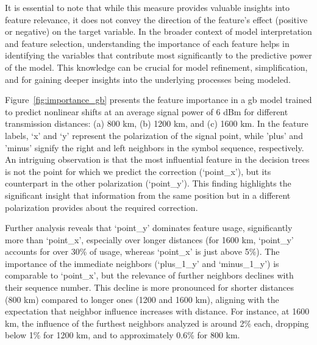 It is essential to note that while this measure provides valuable insights into feature relevance, it does not convey the direction of the feature's effect (positive or negative) on the target variable. In the broader context of model interpretation and feature selection, understanding the importance of each feature helps in identifying the variables that contribute most significantly to the predictive power of the model. This knowledge can be crucial for model refinement, simplification, and for gaining deeper insights into the underlying processes being modeled.

Figure~\ref{fig:importance_gb} presents the feature importance in a \acrshort{gb} model trained to predict nonlinear shifts at an average signal power of 6 dBm for different transmission distances: (a) 800 km, (b) 1200 km, and (c) 1600 km. In the feature labels, `x' and `y' represent the polarization of the signal point, while 'plus' and 'minus' signify the right and left neighbors in the symbol sequence, respectively. An intriguing observation is that the most influential feature in the decision trees is not the point for which we predict the correction (`point\_x'), but its counterpart in the other polarization (`point\_y'). This finding highlights the significant insight that information from the same position but in a different polarization provides about the required correction.

Further analysis reveals that `point\_y' dominates feature usage, significantly more than `point\_x', especially over longer distances (for 1600 km, `point\_y' accounts for over 30\% of usage, whereas `point\_x' is just above 5\%). The importance of the immediate neighbors (`plus\_1\_y' and `minus\_1\_y') is comparable to `point\_x', but the relevance of further neighbors declines with their sequence number. This decline is more pronounced for shorter distances (800 km) compared to longer ones (1200 and 1600 km), aligning with the expectation that neighbor influence increases with distance. For instance, at 1600 km, the influence of the furthest neighbors analyzed is around 2\% each, dropping below 1\% for 1200 km, and to approximately 0.6\% for 800 km.

